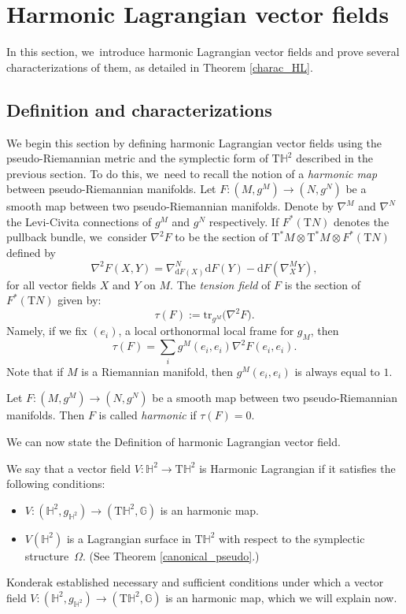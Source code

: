 \section{Harmonic Lagrangian vector fields}\label{sec5_harmo}

In this section, we~introduce harmonic Lagrangian vector fields and prove several characterizations of them, as detailed in Theorem \ref{charac_HL}.

\subsection{Definition and characterizations}
We begin this section by defining harmonic Lagrangian vector fields using the pseudo-Riemannian metric and the symplectic form of $\mathrm{T}\mathbb{H}^2$ described in the previous section. To do this, we~need to recall the notion of a \emph{harmonic map} between pseudo-Riemannian manifolds.
Let $F:(M,g^M)\to(N,g^N)$ be a smooth map between two pseudo-Riemannian manifolds. Denote by $\nabla^{M}$ and $\nabla^{N}$ the Levi-Civita connections of $g^M$ and $g^N$ respectively. If $F^*(\mathrm{T}N)$
denotes the pullback bundle, we~consider $\nabla^2F$ to be the section of $\mathrm{T}^*M\otimes \mathrm{T}^*M\otimes F^*(\mathrm{T}N)$ defined by
\[
\nabla^2F(X,Y)=\nabla_{\mathrm{d}F(X)}^{N}\mathrm{d}F(Y)-\mathrm{d}F(\nabla^{M}_XY),
\]
for all vector fields $X$ and $Y$ on $M$.
The \emph{tension field} of $F$ is the section of $F^*(\mathrm{T}N)$ given by:
\[
\tau(F):=\mathrm{tr}_{g^{M}}\big(\nabla^2F \big).
\]
Namely, if we fix $(e_i)$, a local orthonormal local frame for $g_M$, then
\[
\tau(F)=\sum_{i}g^M(e_i,e_i)\nabla^2F(e_i,e_i).
\]
Note that if $M$ is a Riemannian manifold, then $g^{M}(e_i,e_i)$ is always equal to $1$.
\begin{defi}\label{harmonic_def}
Let $F:(M,g^M)\to(N,g^N)$ be a smooth map between two pseudo-Riemannian manifolds. Then $F$ is called \emph{harmonic} if $\tau(F)=0$.
\end{defi}
We can now state the Definition of harmonic Lagrangian vector field.
\begin{defi}\label{def1}
We say that a vector field $V:\mathbb{H}^2\to\mathrm{T}\mathbb{H}^2$ is Harmonic Lagrangian if it satisfies the following conditions:
\begin{itemize}
\item $V:(\mathbb{H}^2,g_{\mathbb{H}^2})\to(\mathrm{T}\mathbb{H}^2,\mathbb{G})$ is an harmonic map.
\item $V(\mathbb{H}^2)$ is a Lagrangian surface in $\mathrm{T}\mathbb{H}^2$ with respect to the symplectic structure~$\Omega$. (See Theorem \ref{canonical_pseudo}.)
\end{itemize}
\end{defi}
Konderak \cite{on_harmonic_vector_field} established necessary and sufficient conditions under which a vector field $V:(\mathbb{H}^2,g_{\mathbb{H}^2})\to(\mathrm{T}\mathbb{H}^2,\mathbb{G})$ is an harmonic map, which we will explain now.

